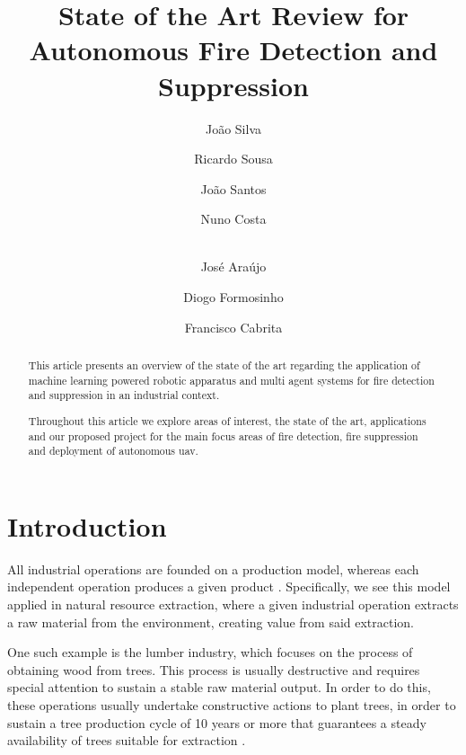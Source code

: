 \documentclass[runningheads]{llncs}
\begin{document}
\title{State of the Art Review for Autonomous Fire Detection and Suppression}

\author{João Silva \and Ricardo Sousa \and
João Santos \and Nuno Costa \and\\ José Araújo \and Diogo Formosinho \and Francisco Cabrita}


\maketitle

\begin{abstract}

This article presents an overview of the state of the art regarding the application of machine learning powered robotic apparatus and multi agent systems for fire detection and suppression in an industrial context.

Throughout this article we explore areas of interest, the state of the art, applications and our proposed project for the main focus areas of fire detection, fire suppression and deployment of autonomous \acrshort{uav}.


\end{abstract}

\section{Introduction}
\label{sec:int}

All industrial operations are founded on a production model, whereas each independent operation produces a given product \cite{industrymwd}. Specifically, we see this model applied in natural resource extraction, where a given industrial operation extracts a raw material from the environment, creating value from said extraction.

One such example is the lumber industry, which focuses on the process of obtaining wood from trees. This process is usually destructive and requires special attention to sustain a stable raw material output. In order to do this, these operations usually undertake constructive actions to plant trees, in order to sustain a tree production cycle of 10 years or more that guarantees a steady availability of trees suitable for extraction \cite{lumber}.
\end{document}
